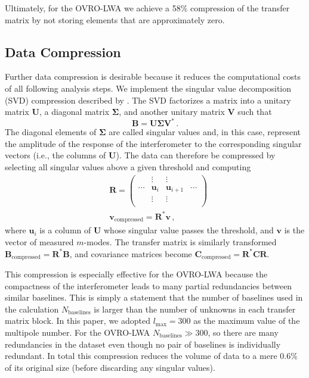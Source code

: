 \documentclass[twocolumn]{aastex62}
\renewcommand{\b}{\pmb}
\begin{document}
Ultimately, for the OVRO-LWA we achieve a 58\% compression of the transfer matrix by not storing
elements that are approximately zero.

\subsection{Data Compression}\label{sec:compression}

Further data compression is desirable because it reduces the computational costs of all following
analysis steps. We implement the singular value decomposition (SVD) compression described by
\citep{2014ApJ...781...57S, 2015PhRvD..91h3514S}. The SVD factorizes a matrix into a unitary matrix
$\b U$, a diagonal matrix $\b\Sigma$, and another unitary matrix $\b V$ such that
\begin{equation}
    \b B = \b U \b\Sigma \b V^*\,.
\end{equation}
The diagonal elements of $\b\Sigma$ are called singular values and, in this case, represent the
amplitude of the response of the interferometer to the corresponding singular vectors (i.e., the
columns of $\b U$). The data can therefore be compressed by selecting all singular values above a
given threshold and computing
\begin{align}
    &\b R = \begin{pmatrix}
        & \vdots & \vdots & \\
        \cdots & \b u_{i} & \b u_{i+1} & \cdots \\
        & \vdots & \vdots & \\
    \end{pmatrix} \\
    &\b v_\text{compressed} = \b R^*\b v\,,
\end{align}
where $\b u_i$ is a column of $\b U$ whose singular value passes the threshold, and $\b v$ is the
vector of measured $m$-modes. The transfer matrix is similarly transformed $\b B_\text{compressed} =
\b R^*\b B$, and covariance matrices become $\b C_\text{compressed} = \b R^*\b C\b R$.

This compression is especially effective for the OVRO-LWA because the compactness of the
interferometer leads to many partial redundancies between similar baselines. This is simply a
statement that the number of baselines used in the calculation $N_\text{baselines}$ is larger than
the number of unknowns in each transfer matrix block. In this paper, we adopted $l_\text{max} = 300$
as the maximum value of the multipole number. For the OVRO-LWA $N_\text{baselines} \gg 300$, so
there are many redundancies in the dataset even though no pair of baselines is individually
redundant. In total this compression reduces the volume of data to a mere 0.6\% of its original
size (before discarding any singular values).
\end{document}
